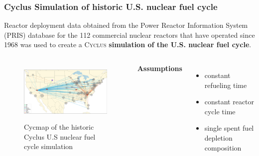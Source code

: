 \begin{frame}
    \frametitle{Cyclus Simulation of historic U.S. nuclear fuel cycle}
        Reactor deployment data obtained from the Power Reactor Information System (PRIS) database \cite{peterson_unf_2017} for the 112 commercial nuclear reactors that have operated since 1968 was used to create a \textsc{Cyclus} \textbf{simulation of the U.S. nuclear fuel cycle}. 
        \begin{columns}
        \column[t]{5cm}
    \begin{figure}[htbp!]
      \begin{center}
        \includegraphics[height=3cm]{../figures/cycmap}
      \end{center}
            \caption{Cycmap of the historic Cyclus U.S nuclear fuel cycle simulation \cite{park_arfc/cycmap_2018}}
      \label{fig:cycmap}
    \end{figure}
    \column[t]{5cm}
    \textbf{Assumptions} 
    \begin{itemize}
    \item constant refueling time 
    \item constant reactor cycle time 
    \item single spent fuel depletion composition
    \end{itemize}
  \end{columns}
  \end{frame}
